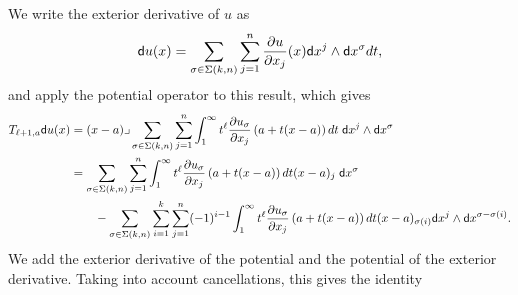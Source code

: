 \documentclass[a4paper]{article}
\begin{document}
We write the exterior derivative of $u$ as 
\begin{align*}
    {\mathsf d} u(x)
    =
    \sum_{\sigma \in \Sigma(k,n)} \sum_{j=1}^{n}
    \frac{ \partial u }{\partial x_{j}}(x) {\mathsf d}x^{j} \wedge {\mathsf d}x^{\sigma} dt 
    ,
\end{align*}
and apply the potential operator to this result, which gives 
\begin{align*}
    T_{\ell+1,a} {\mathsf d} u(x)
    &=
    (x-a)\lrcorner 
    \sum_{\sigma \in \Sigma(k,n)} \sum_{j=1}^{n}
    \int_{1}^\infty t^{\ell} \frac{ \partial u_{\sigma} }{\partial x_{j}}\left(a+t(x-a)\right) dt 
    \;{\mathsf d}x^{j} \wedge {\mathsf d}x^{\sigma}
    \\&
    = 
    \sum_{\sigma \in \Sigma(k,n)} \sum_{j=1}^{n}
    \int_{1}^\infty t^{\ell} \frac{ \partial u_{\sigma} }{\partial x_{j}}\left(a+t(x-a)\right) dt (x-a)_{j}
    \;{\mathsf d}x^{\sigma}
    \\&\qquad 
    - 
    \sum_{\sigma \in \Sigma(k,n)} \sum_{i=1}^{k} \sum_{j=1}^{n}
    (-1)^{i-1}
    \int_{1}^\infty t^{\ell} \frac{ \partial u_{\sigma} }{\partial x_{j}}\left(a+t(x-a)\right) dt 
    (x-a)_{\sigma(i)} {\mathsf d}x^{j} \wedge {\mathsf d}x^{\sigma-\sigma(i)}
    .
\end{align*}
We add the exterior derivative of the potential and the potential of the exterior derivative.
Taking into account cancellations, this gives the identity 
\end{document}
